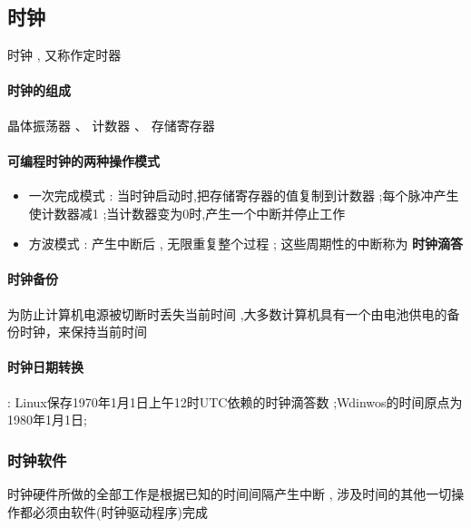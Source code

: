 \documentclass[UTF8,a4paper]{ctexart}
\begin{document}
\subsection{时钟}
时钟 , 又称作定时器
\paragraph{时钟的组成} 晶体振荡器 、 计数器 、 存储寄存器

\paragraph{可编程时钟的两种操作模式}
\begin{itemize}
	\item 一次完成模式 : 当时钟启动时,把存储寄存器的值复制到计数器 ;每个脉冲产生使计数器减1 ;当计数器变为0时,产生一个中断并停止工作
	\item 方波模式 : 产生中断后 , 无限重复整个过程 ; 这些周期性的中断称为 \textbf{时钟滴答}
\end{itemize}

\paragraph{时钟备份}为防止计算机电源被切断时丢失当前时间 ,大多数计算机具有一个由电池供电的备份时钟，来保持当前时间

\paragraph{时钟日期转换} : Linux保存1970年1月1日上午12时UTC依赖的时钟滴答数 ;Wdinwos的时间原点为1980年1月1日;

\subsubsection{时钟软件}
时钟硬件所做的全部工作是根据已知的时间间隔产生中断 , 涉及时间的其他一切操作都必须由软件(时钟驱动程序)完成
\end{document}
